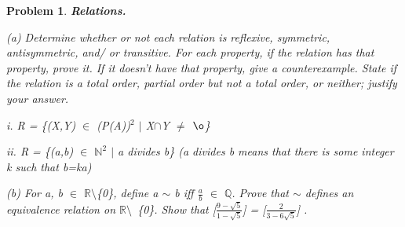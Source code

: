 \documentclass{article}
\newtheorem{problem}{Problem}
\theoremstyle{definition}
\begin{document}
\begin{problem}
\textbf{Relations.}

(a) Determine whether or not each relation is reflexive, symmetric, antisymmetric, and/ or transitive. For each property, if the relation has that property, prove it.
If it doesn't have that property, give a counterexample. State if the relation is a total order, partial order but not a total order, or neither; justify your answer.

i. R = \{(X,Y) \(\in\) (P(A))\(^2\) \(|\) X\(\cap\)Y \(\neq\) \(\o\)\}

ii. R = \{(a,b) \(\in\) \(\mathbb{N}^2\) \(|\) a divides b\} (a divides b means that there is some integer k such that b=ka)

(b) For a, b \(\in\) \(\mathbb{R}\)\(\setminus\)\{0\}, define a \(\sim\) b iff \(\frac{a}{b}\) \(\in\) \(\mathbb{Q}\). Prove that \(\sim\) defines an equivalence relation on \(\mathbb{R}\)\(\setminus\)\ \{0\}. Show that [\(\frac{9-\sqrt{5}}{1-\sqrt{5}}\)] =  [\(\frac{2}{3-6\sqrt{5}}\)] .\\\\
\end{problem}
\end{document}
